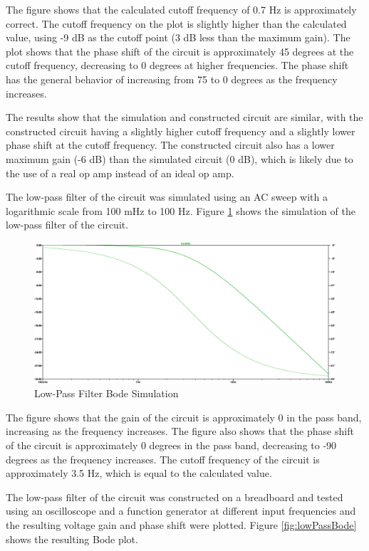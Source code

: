 \documentclass[CMPE]{KGCOEReport}
\begin{document}
The figure shows that the calculated cutoff frequency of 0.7 Hz is approximately correct. The cutoff frequency on the plot is slightly higher than the calculated value, using -9 dB as the cutoff point (3 dB less than the maximum gain). The plot shows that the phase shift of the circuit is approximately 45 degrees at the cutoff frequency, decreasing to 0 degrees at higher frequencies. The phase shift has the general behavior of increasing from 75 to 0 degrees as the frequency increases.

The results show that the simulation and constructed circuit are similar, with the constructed circuit having a slightly higher cutoff frequency and a slightly lower phase shift at the cutoff frequency. The constructed circuit also has a lower maximum gain (-6 dB) than the simulated circuit (0 dB), which is likely due to the use of a real op amp instead of an ideal op amp.

\bigskip

The low-pass filter of the circuit was simulated using an AC sweep with a logarithmic scale from 100 mHz to 100 Hz. Figure \ref{fig:lowPassSim} shows the simulation of the low-pass filter of the circuit.

\begin{figure}[H]
    \centering
    \includegraphics[width=1\textwidth]{SimFreqLowPass.png}
    \caption{Low-Pass Filter Bode Simulation}
    \label{fig:lowPassSim}
\end{figure}

The figure shows that the gain of the circuit is approximately 0 in the pass band, increasing as the frequency increases. The figure also shows that the phase shift of the circuit is approximately 0 degrees in the pass band, decreasing to -90 degrees as the frequency increases. The cutoff frequency of the circuit is approximately 3.5 Hz, which is equal to the calculated value.

The low-pass filter of the circuit was constructed on a breadboard and tested using an oscilloscope and a function generator at different input frequencies and the resulting voltage gain and phase shift were plotted. Figure \ref{fig:lowPassBode} shows the resulting Bode plot.
\end{document}
